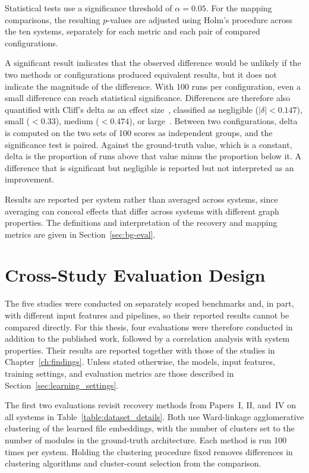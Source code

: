 Statistical tests use a significance threshold of $\alpha = 0.05$. For the mapping comparisons, the resulting $p$-values are adjusted using Holm's procedure across the ten systems, separately for each metric and each pair of compared configurations.

A significant result indicates that the observed difference would be unlikely if the two methods or configurations produced equivalent results, but it does not indicate the magnitude of the difference. With 100 runs per configuration, even a small difference can reach statistical significance. Differences are therefore also quantified with Cliff's delta as an effect size~\cite{cliff}, classified as negligible ($|\delta| < 0.147$), small ($< 0.33$), medium ($< 0.474$), or large~\cite{romano2006}. Between two configurations, delta is computed on the two sets of 100 scores as independent groups, and the significance test is paired. Against the ground-truth value, which is a constant, delta is the proportion of runs above that value minus the proportion below it. A difference that is significant but negligible is reported but not interpreted as an improvement.

Results are reported per system rather than averaged across systems, since averaging can conceal effects that differ across systems with different graph properties. The definitions and interpretation of the recovery and mapping metrics are given in Section~\ref{sec:bg-eval}.

\section{Cross-Study Evaluation Design\label{sec:cross_study_eval}}
The five studies were conducted on separately scoped benchmarks and, in part, with different input features and pipelines, so their reported results cannot be compared directly. For this thesis, four evaluations were therefore conducted in addition to the published work, followed by a correlation analysis with system properties. Their results are reported together with those of the studies in Chapter~\ref{ch:findings}. Unless stated otherwise, the models, input features, training settings, and evaluation metrics are those described in Section~\ref{sec:learning_settings}.
 
The first two evaluations revisit recovery methods from Papers~I, II, and~IV on all systems in Table~\ref{table:dataset_details}. Both use Ward-linkage agglomerative clustering of the learned file embeddings, with the number of clusters set to the number of modules in the ground-truth architecture. Each method is run 100 times per system. Holding the clustering procedure fixed removes differences in clustering algorithms and cluster-count selection from the comparison.
 
